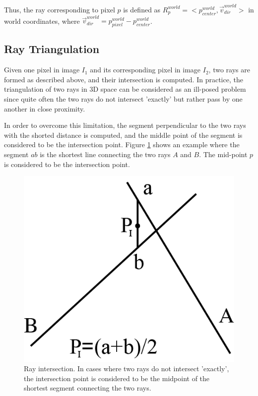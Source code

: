 \documentclass[final,12pt,3p]{elsarticle}
\begin{document}
Thus, the ray corresponding to pixel $p$ is defined as $R_{p}^{world} = < p_{center}^{world}, \vec{v}_{dir}^{world}>$ in world coordinates, where $\vec{v}_{dir}^{world} = p_{pixel}^{world} - p_{center}^{world}$.

\subsection{Ray Triangulation}
\label{subsec:ray_triangulation}

Given one pixel in image $I_{1}$ and its corresponding pixel in image $I_{2}$, two rays are formed as described above, and their intersection is computed. In practice, the triangulation of two rays in 3D space can be considered as an ill-posed problem since quite often the two rays do not intersect 'exactly' but rather pass by one another in close proximity. 

In order to overcome this limitation, the segment perpendicular to the two rays with the shorted distance is computed, and the middle point of the segment is considered to be the intersection point. Figure \ref{fig:raysNotInters} shows an example where the segment $ab$ is the shortest line connecting the two rays $A$ and $B$. The mid-point $p$ is considered to be the intersection point.

\begin{figure}[!ht]
	\centering
	\includegraphics[scale=1]{./not_inters_rays.png}
	\caption{\label{fig:raysNotInters} Ray intersection. In cases where two rays do not intersect 'exactly', the intersection point is considered to be the midpoint of the shortest segment connecting the two rays.}
\end{figure}
\end{document}
